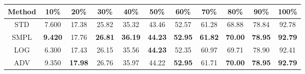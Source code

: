 \documentclass{standalone}
\begin{document}
\begin{tabular}{c|cccccccccc}
      \toprule
      Method & 10\% & 20\% & 30\% & 40\% & 50\% & 60\% & 70\% & 80\% & 90\% & 100\% \\
      \midrule
STD & 7.600 & 17.38 & 25.82 & 35.32 & 43.46 & 52.57 & 61.28 & 68.88 & 78.84 & 92.78\\
SMPL & \textbf{9.420} & 17.76 & \textbf{26.81} & \textbf{36.19} & \textbf{44.23} & \textbf{52.95} & \textbf{61.82} & \textbf{70.00} & \textbf{78.95} & \textbf{92.79}\\
LOG & 6.300 & 17.43 & 26.15 & 35.56 & \textbf{44.23} & 52.35 & 60.97 & 69.71 & 78.90 & 92.41\\
ADV & 9.350 & \textbf{17.98} & 26.76 & 35.97 & 44.22 & \textbf{52.95} & 61.71 & \textbf{70.00} & \textbf{78.95} & \textbf{92.79}\\
  \bottomrule
\end{tabular}
\end{document}
